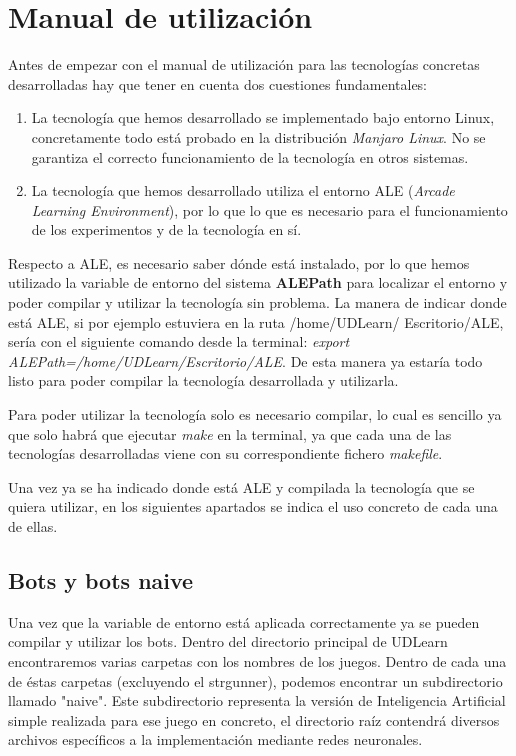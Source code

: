 \section{Manual de utilización}
\label{sec:usageManual}

Antes de empezar con el manual de utilización para las tecnologías concretas desarrolladas hay que tener en cuenta dos cuestiones fundamentales:

\begin{enumerate}
    \item La tecnología que hemos desarrollado se implementado bajo entorno Linux, concretamente todo está probado en la distribución \textit{Manjaro Linux}. No se garantiza el correcto funcionamiento de la tecnología en otros sistemas.
    \item La tecnología que hemos desarrollado utiliza el entorno ALE (\textit{Arcade Learning Environment}), por lo que lo que es necesario para el funcionamiento de los experimentos y de la tecnología en sí.
\end{enumerate}

Respecto a ALE, es necesario saber dónde está instalado, por lo que hemos utilizado la variable de entorno del sistema \textbf{ALEPath} para localizar el entorno y poder compilar y utilizar la tecnología sin problema. La manera de indicar donde está ALE, si por ejemplo estuviera en la ruta /home/UDLearn/ Escritorio/ALE, sería con el siguiente comando desde la terminal: \textit{export ALEPath=/home/UDLearn/Escritorio/ALE}. De esta manera ya estaría todo listo para poder compilar la tecnología desarrollada y utilizarla.

Para poder utilizar la tecnología solo es necesario compilar, lo cual es sencillo ya que solo habrá que ejecutar \textit{make} en la terminal, ya que cada una de las tecnologías desarrolladas viene con su correspondiente fichero \textit{makefile}.

Una vez ya se ha indicado donde está ALE y compilada la tecnología que se quiera utilizar, en los siguientes apartados se indica el uso concreto de cada una de ellas.

\newpage
\subsection{Bots y bots naive}
Una vez que la variable de entorno está aplicada correctamente ya se pueden compilar y utilizar los bots. Dentro del directorio principal de UDLearn encontraremos varias carpetas con los nombres de los juegos. Dentro de cada una de éstas carpetas (excluyendo el strgunner), podemos encontrar un subdirectorio llamado "naive". Este subdirectorio representa la versión de Inteligencia Artificial simple realizada para ese juego en concreto, el directorio raíz contendrá diversos archivos específicos a la implementación mediante redes neuronales.

